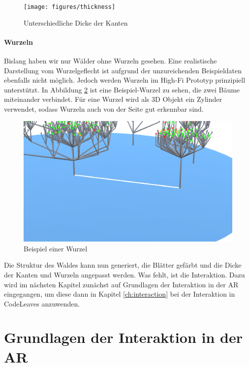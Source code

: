\begin{figure}[htb]
  \texttt{[image: figures/thickness]}
  \caption{Unterschiedliche Dicke der Kanten}
  \label{fig:thickness}
\end{figure}

\subsubsection*{Wurzeln}

Bislang haben wir nur Wälder ohne Wurzeln gesehen. Eine realistische Darstellung vom Wurzelgeflecht ist aufgrund der unzureichenden Beispieldaten ebenfalls nicht möglich. Jedoch werden Wurzeln im High-Fi Prototyp prinzipiell  unterstützt. In Abbildung \ref{fig:root} ist eine Beispiel-Wurzel zu sehen, die zwei Bäume miteinander verbindet. Für eine Wurzel wird als 3D Objekt ein Zylinder verwendet, sodass Wurzeln auch von der Seite gut erkennbar sind.

\begin{figure}[htb]
  \includegraphics[width=\textwidth]{figures/root}
  \caption{Beispiel einer Wurzel}
  \label{fig:root}
\end{figure}

Die Struktur des Waldes kann nun generiert, die Blätter gefärbt und die Dicke der Kanten und Wurzeln angepasst werden. Was fehlt, ist die Interaktion. Dazu wird im nächsten Kapitel zunächst auf Grundlagen der Interaktion in der AR eingegangen, um diese dann in Kapitel \ref{ch:interaction} bei der Interaktion in CodeLeaves anzuwenden.

\chapter{Grundlagen der Interaktion in der AR}
\label{ch:interaction-ar}

